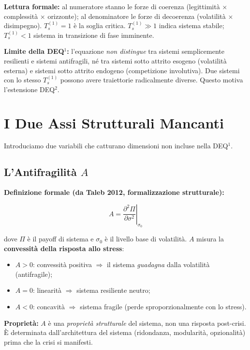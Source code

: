 \Proved{} \textbf{Lettura formale:} al numeratore stanno le forze di
coerenza (legittimità $\times$ complessità $\times$ orizzonte); al denominatore le
forze di decoerenza (volatilità $\times$ disimpegno). \(T_s^{(1)} = 1\) è la
soglia critica. \(T_s^{(1)} \gg 1\) indica sistema stabile;
\(T_s^{(1)} < 1\) sistema in transizione di fase imminente.

\Conj{} \textbf{Limite della DEQ$^1$:} l'equazione \emph{non distingue} tra
sistemi semplicemente resilienti e sistemi antifragili, né tra sistemi
sotto attrito esogeno (volatilità esterna) e sistemi sotto attrito
endogeno (competizione involutiva). Due sistemi con lo stesso
\(T_s^{(1)}\) possono avere traiettorie radicalmente diverse. Questo
motiva l'estensione DEQ$^2$.



\section{I Due Assi Strutturali
Mancanti}\label{i-due-assi-strutturali-mancanti}

Introduciamo due variabili che catturano dimensioni non incluse nella
DEQ$^1$.

\subsection{\texorpdfstring{L'Antifragilità
\(A\)}{L'Antifragilità A}}\label{lantifragilituxe0-a}

\Proved{} \textbf{Definizione formale (da Taleb 2012, formalizzazione
strutturale):}

\[
A = \left.\frac{\partial^2 \Pi}{\partial \sigma^2}\right|_{\sigma_0}
\]

dove \(\Pi\) è il payoff di sistema e \(\sigma_0\) è il livello base di
volatilità. \(A\) misura la \textbf{convessità della risposta allo
stress}:

\begin{itemize}
\tightlist
\item
  \(A > 0\): convessità positiva $\Rightarrow$ il sistema \emph{guadagna} dalla
  volatilità (antifragile);
\item
  \(A = 0\): linearità $\Rightarrow$ sistema resiliente neutro;
\item
  \(A < 0\): concavità $\Rightarrow$ sistema fragile (perde sproporzionalmente con
  lo stress).
\end{itemize}

\Hypoth{} \textbf{Proprietà:} \(A\) è una \emph{proprietà strutturale}
del sistema, non una risposta post-crisi. È determinata
dall'architettura del sistema (ridondanza, modularità, opzionalità)
prima che la crisi si manifesti.

